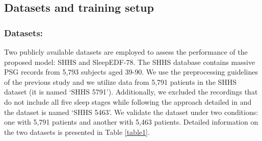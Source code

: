 
%
%



\subsection{Datasets and training setup}  %



\subsubsection{Datasets:} \label{section4_dataset}
Two publicly available datasets are employed to assess the performance of the proposed model: SHHS and SleepEDF-78.
%
The SHHS database contains massive PSG records from 5,793 subjects aged 39-90. 
%
We use the preprocessing guidelines of the previous study and we utilize data from 5,791 patients in the SHHS dataset (it is named `SHHS 5791'). Additionally, we excluded the recordings that do not include all five sleep stages while following the approach detailed in \cite{SORS2018107} and the dataset is named `SHHS 5463'. 
%
%
We validate the dataset under two conditions: one with 5,791 patients and another with 5,463 patients. Detailed information on the two datasets is presented in Table \ref{table1}.

